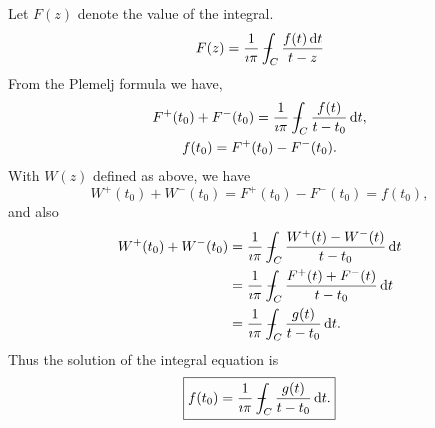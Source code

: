 \begin{Solution}
  Let $F(z)$ denote the value of the integral.
  \[
  F(z) = \frac{1}{\imath \pi} - \negthickspace \negthickspace \negthickspace \negmedspace \int_C \frac{ f(t) \,\mathrm{d} t}{ t-z}
  \]
  From the Plemelj formula we have,
  \begin{gather*}
    F^+(t_0) + F^-(t_0) = \frac{1}{\imath \pi} - \negthickspace \negthickspace \negthickspace \negmedspace\int_C \frac{f(t)}{t-t_0}\,\mathrm{d} t, \\
    f(t_0) = F^+(t_0) - F^-(t_0).
  \end{gather*}
  With $W(z)$ defined as above, we have
  \[
  W^+(t_0) + W^-(t_0) = F^+(t_0) - F^-(t_0) = f(t_0),
  \]
  and also
  \begin{align*}
    W^+(t_0) + W^-(t_0) 
    &= \frac{1}{\imath \pi} \pv\int_C \frac{W^+(t) - W^-(t)}{t-t_0} \,\dd t \\
    &= \frac{1}{\imath \pi} \pv\int_C \frac{F^+(t) + F^-(t)}{t-t_0} \,\dd t \\
    &= \frac{1}{\imath \pi} \pv\int_C \frac{g(t)}{t-t_0} \,\dd t. \\
  \end{align*}
  Thus the solution of the integral equation is
  \[
  \boxed{
    f(t_0) = \frac{1}{\imath \pi} - \negthickspace \negthickspace \negthickspace \negmedspace\int_C \frac{g(t)}{t-t_0} \,\mathrm{d} t.
    }
  \]
\end{Solution}







